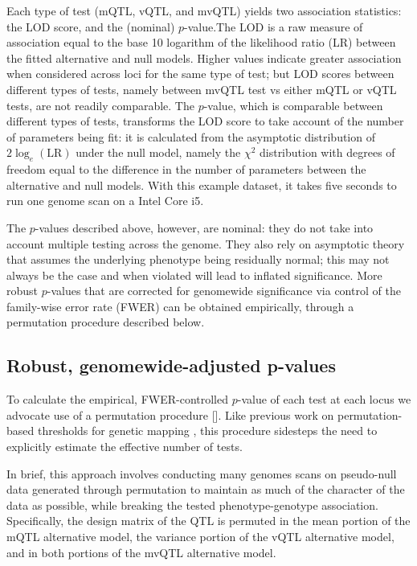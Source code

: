 \documentclass[9pt,twocolumn,twoside]{gsag3jnl}
\begin{document}
Each type of test (mQTL, vQTL, and mvQTL) yields two association statistics: the LOD score, and the (nominal) $p$-value.The LOD is a raw measure of association equal to the base 10 logarithm of the likelihood ratio (LR) between the fitted alternative and null models. Higher values indicate greater association when considered across loci for the same type of test; but LOD scores between different types of tests, namely between mvQTL test vs either mQTL or vQTL tests, are not readily comparable. The $p$-value, which is comparable between different types of tests, transforms the LOD score to take account of the number of parameters being fit: it is calculated from the asymptotic distribution of $2\log_e\left(\text{LR}\right)$ under the null model, namely the $\chi^2$ distribution with degrees of freedom equal to the difference in the number of parameters between the alternative and null models. With this example dataset, it takes five seconds to run one genome scan on a Intel Core i5.

The $p$-values described above, however, are nominal: they do not take into account multiple testing across the genome. They also rely on asymptotic theory that assumes the underlying phenotype being residually normal; this may not always be the case and when violated will lead to inflated significance. More robust $p$-values that are corrected for genomewide significance via control of the family-wise error rate (FWER) can be obtained empirically, through a permutation procedure described below.

\subsection{Robust, genomewide-adjusted p-values}

To calculate the empirical, FWER-controlled $p$-value of each test at each locus we advocate use of a permutation procedure [\CortyMethodsPaper].
Like previous work on permutation-based thresholds for genetic mapping \citep{Churchill1994,Carlborg2002}, this procedure sidesteps the need to explicitly estimate the effective number of tests.

In brief, this approach involves conducting many genomes scans on pseudo-null data generated through permutation to maintain as much of the character of the data as possible, while breaking the tested phenotype-genotype association.
Specifically, the design matrix of the QTL is permuted in the mean portion of the mQTL alternative model, the variance portion of the vQTL alternative model, and in both portions of the mvQTL alternative model.
\end{document}
